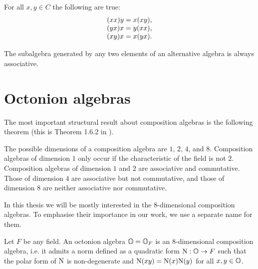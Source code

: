 \begin{lemma}
	For all $x,y \in C$ the following are true:\\
	\begin{equation}
		\begin{array}{r@{\;}c@{\;}l}
			(xx)y & = & x(xy), \\
			(yx)x & = & y(xx), \\
			(xy)x & = & x(yx).
		\end{array}
	\end{equation}
\end{lemma}

\begin{theorem}[Artin]
	The subalgebra generated by any two elements of an alternative algebra is always associative.
\end{theorem}

\section{Octonion algebras}

The most important structural result about composition algebras is the following theorem
(this is Theorem 1.6.2 in \cite{SpringerVeldkamp}).

\begin{theorem}
	The possible dimensions of a composition algebra are $1$, $2$, $4$, and $8$. Composition 
	algebras of dimension $1$ only occur if the characteristic	 of the field is not $2$. 
	Composition algebras of dimension $1$ and $2$ are associative and commutative. Those
	of dimension $4$ are associative but not commutative, and those of dimension $8$ are
	neither associative nor commutative. 
\end{theorem}

In this thesis we will be mostly interested in the $8$-dimensional composition algebras. 
To emphasise their importance in our work, we use a separate name for them. 

\begin{definition}
	Let $F$ be any field. An octonion algebra $\mathbb{O} = \mathbb{O}_F$ is an $8$-dimensional composition
	algebra, i.e. it admits a norm defined as a quadratic form $\mathord{\mathrm{N}} : \mathbb{O} \rightarrow F$
	such that the polar form of\/ $\mathord{\mathrm{N}}$ is non-degenerate and $\mathord{\mathrm{N}}(xy) = \mathord{\mathrm{N}}(x) \mathord{\mathrm{N}}(y)$ for 
	all $x,y \in \mathbb{O}$.  
\end{definition}

